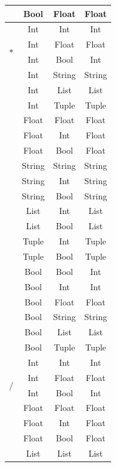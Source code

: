 \documentclass[12pt, titlepage]{article}
\begin{document}
\begin{longtable}{ |c |c |c |c | }
	                     & Bool & Float & Float \\
	                     \hline
	\multirow{4}{*}{$*$} & Int & Int & Int \\
	                     & Int & Float & Float \\
	                     & Int & Bool & Int \\
	                     & Int & String & String \\
	                     & Int & List & List \\
	                     & Int & Tuple & Tuple \\
	                     & Float & Float & Float \\
	                     & Float & Int & Float \\
	                     & Float & Bool & Float \\
	                     & String & String & String \\
	                     & String & Int & String \\
	                     & String & Bool & String \\
	                     & List & Int & List \\ 
	                     & List & Bool & List \\ 
	                     & Tuple & Int & Tuple \\
	                     & Tuple & Bool & Tuple \\
	                     & Bool & Bool & Int \\
	                     & Bool & Int & Int \\
	                     & Bool & Float & Float \\
	                     & Bool & String & String \\
	                     & Bool & List & List \\
	                     & Bool & Tuple & Tuple \\
	                     \hline
	\multirow{4}{*}{$/$} & Int & Int & Int \\
	                     & Int & Float & Float \\
	                     & Int & Bool & Int \\
	                     & Float & Float & Float \\
	                     & Float & Int & Float \\ 
	                     & Float & Bool & Float \\ 
	                     & List & List & List \\ 

\end{longtable}
\end{document}
